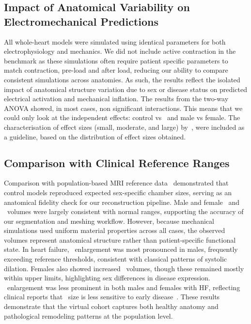\subsection{Impact of Anatomical Variability on Electromechanical Predictions}
All whole-heart models were simulated using identical parameters for both electrophysiology and mechanics. 
We did not include active contraction in the benchmark as these simulations often require patient specific 
parameters to match contraction, pre-load and after load, 
reducing our ability to compare consistent simulations across anatomies.
As such, the results reflect the isolated impact of anatomical structure variation
due to sex or disease status on predicted electrical activation and mechanical inflation.
The results from the two-way ANOVA showed, in most cases, non significant interactions.
This means that we could only look at the independent effects: control vs \HF\ and 
male vs female. 
The characterisation of effect sizes (small, moderate, and large) by~\cite{gignac-2016-effects}, 
were included as a guideline, based on the distribution of effect sizes obtained.

\subsection{Comparison with Clinical Reference Ranges}
Comparison with population-based MRI reference data~\cite{petersen-2017-reference} 
demonstrated that control models reproduced expected sex-specific chamber sizes, 
serving as an anatomical fidelity check for our reconstruction pipeline. 
Male and female \LV\ and \RV\ volumes were largely consistent with normal ranges, 
supporting the accuracy of our segmentation and meshing workflow. 
However, because mechanical simulations used uniform material properties across all cases, 
the observed volumes represent anatomical structure rather than patient-specific functional state. 
In heart failure, \LV\ enlargement was most pronounced in males, frequently exceeding 
reference thresholds, consistent with classical patterns of systolic dilation. 
Females also showed increased \LV\ volumes, though these remained mostly within upper limits, 
highlighting sex differences in disease expression. 
\RV\ enlargement was less prominent in both males and females with HF, 
reflecting clinical reports that \RV\ size is less sensitive to early disease~\cite{ro-2023-rv_volume}. 
These results demonstrate that the virtual cohort captures both healthy anatomy and 
pathological remodeling patterns at the population level.


